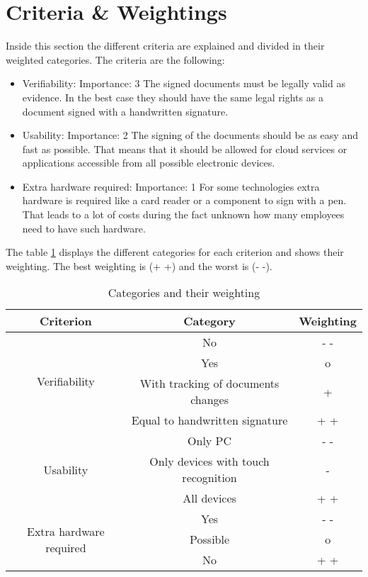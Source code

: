 \section{Criteria \& Weightings} \label{es:sec:criteria}
Inside this section the different criteria are explained and divided in their weighted categories. The criteria are the following:
\begin{itemize}
	\item Verifiability: \newline
	Importance: 3 \newline
	The signed documents must be legally valid as evidence. In the best case they should have the same legal rights as a document signed with a handwritten signature.
	\item Usability: \newline
	Importance: 2 \newline
	The signing of the documents should be as easy and fast as possible. That means that it should be allowed for cloud services or applications accessible from all possible electronic devices. 
	\item Extra hardware required: \newline
	Importance: 1 \newline
	For some technologies extra hardware is required like a card reader or a component to sign with a pen. That leads to a lot of costs during the fact unknown how many employees need to have such hardware.
\end{itemize} 

The table \ref{ES:Tab:criteria} displays the different categories for each criterion and shows their weighting. The best weighting is (+ +) and the worst is (- -). 

\begin{table}[h]
	\centering
	\begin{tabular}{|c|c|c|} \hline
		\rowcolor{Gray}Criterion  & Category & Weighting \\ \hline
		\multirow{4}{*}{Verifiability} & No & - - \\ \cline{2-3}
									   & Yes & o \\ \cline{2-3}
									   & With tracking of documents changes & + \\ \cline{2-3}
									   & Equal to handwritten signature & + + \\ \cline{1-3}
		\multirow{3}{*}{Usability} & Only PC & - - \\ \cline{2-3}
		                           & Only devices with touch recognition & - \\ \cline{2-3}
								   & All devices & + + \\ \cline{1-3}
		\multirow{3}{*}{Extra hardware required} & Yes & - -\\ \cline{2-3}
												& Possible & o \\ \cline{2-3}
												& No & + +  \\ \cline{1-3}
	\end{tabular}
	\caption{Categories and their weighting}
	\label{ES:Tab:criteria}
\end{table}